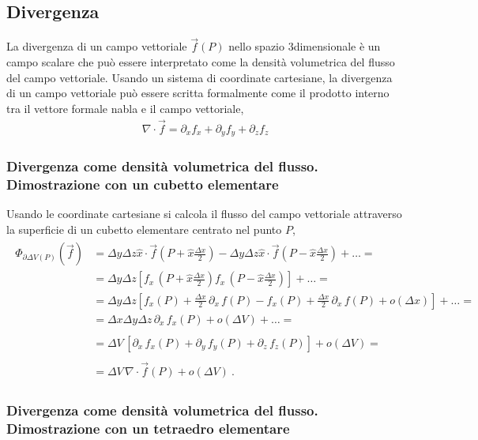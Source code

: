 \documentclass[letterpaper,10pt,italian]{jupyterBook}
\begin{document}
\subsection{Divergenza}
\label{\detokenize{ch/vector-calculus/derivatives:divergenza}}
\sphinxAtStartPar
La divergenza di un campo vettoriale \(\vec{f}(P)\) nello spazio 3\sphinxhyphen{}dimensionale è un campo scalare che può essere interpretato come la densità volumetrica del flusso del campo vettoriale. Usando un sistema di coordinate cartesiane, la divergenza di un campo vettoriale può essere scritta formalmente come il prodotto interno tra il vettore formale nabla e il campo vettoriale,
\begin{equation*}
\begin{split}\nabla \cdot \vec{f} = \partial_x f_x + \partial_y f_y + \partial_z f_z\end{split}
\end{equation*}\subsubsection*{Divergenza come densità volumetrica del flusso. Dimostrazione con un cubetto elementare}

\sphinxAtStartPar
Usando le coordinate cartesiane si calcola il flusso del campo vettoriale attraverso la superficie di un cubetto elementare centrato nel punto \(P\), 
\begin{equation*}
\begin{split}\begin{aligned}
  \Phi_{\partial \Delta V(P)}\left(\vec{f}\right) 
  & = \Delta y \Delta z \hat{x} \cdot \vec{f}\left(P+\hat{x} \frac{\Delta x}{2} \right)
    - \Delta y \Delta z \hat{x} \cdot \vec{f}\left(P-\hat{x} \frac{\Delta x}{2} \right) + \dots = \\
  & = \Delta y \Delta z \left[ f_x \, \left(P+\hat{x} \frac{\Delta x}{2} \right)
                               f_x \, \left(P-\hat{x} \frac{\Delta x}{2} \right) \right] + \dots = \\
  & = \Delta y \Delta z \left[ f_x(P) + \frac{\Delta x}{2} \,  \partial_x \, f(P) 
                             - f_x(P) + \frac{\Delta x}{2} \,  \partial_x \, f(P) + o(\Delta x) \right] + \dots  = \\
  & = \Delta x \Delta y \Delta z \,  \partial_x \, f_x(P) + o(\Delta V) + \dots = \\ \\
  & = \Delta V \, \left[  \partial_x \, f_x(P) +  \partial_y \, f_y(P) + \partial_z \, f_z(P) \right] + o(\Delta V) = \\ \\
  & = \Delta V \, \nabla \cdot \vec{f}(P) + o(\Delta V) \ .
\end{aligned}\end{split}
\end{equation*}\subsubsection*{Divergenza come densità volumetrica del flusso. Dimostrazione con un tetraedro elementare}
\end{document}
